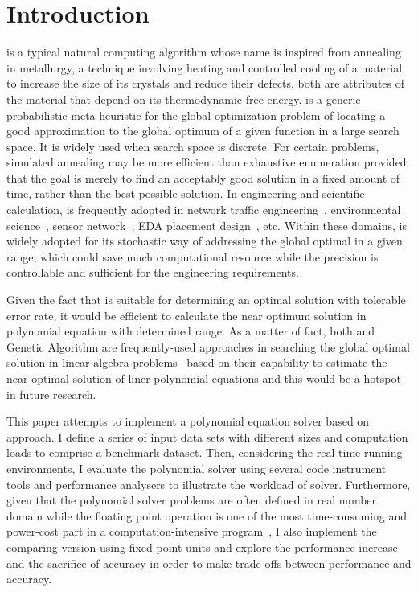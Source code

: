 \section{Introduction}
\label{sec:intro}
\SA is a typical natural computing algorithm whose name is inspired from  annealing in metallurgy, a technique involving heating and controlled cooling of a material to increase the size of its crystals and reduce their defects, both are attributes of the material that depend on its thermodynamic free energy. \SA is a generic probabilistic meta-heuristic for the global optimization problem of locating a good approximation to the global optimum of a given function in a large search space. It is widely used when search space is discrete. For certain problems, simulated annealing may be more efficient than exhaustive enumeration provided that the goal is merely to find an acceptably good solution in a fixed amount of time, rather than the best possible solution. In engineering and scientific calculation, \SA is frequently adopted in network traffic engineering~\cite{Pasias:2004}, environmental science~\cite{Jingwen:2009}, sensor network~\cite{Zimmerman:2007}, EDA placement design~\cite{Naifeng:2011}, etc. Within these domains, \SA is widely adopted for its stochastic way of addressing the global optimal in a given range, which could save much computational resource while the precision is controllable and sufficient for the engineering requirements.

Given the fact that \SA is suitable for determining an optimal solution with tolerable error rate, it would be efficient to calculate the near optimum solution in polynomial equation with determined range. As a matter of fact, both \SA and Genetic Algorithm are frequently-used approaches in searching the global optimal solution in linear algebra problems~\cite{Chen:1998} based on their capability to estimate the near optimal solution of liner polynomial equations and this would be a hotspot in future research.

This paper attempts to implement a polynomial equation solver based on \SA approach. I define a series of input data sets with different sizes and computation loads to comprise a benchmark dataset. Then, considering the real-time running environments, I evaluate the \SA polynomial solver using several code instrument tools and performance analysers to illustrate the workload of \SA solver. Furthermore, given that the polynomial solver problems are often defined in real number domain while the floating point operation is one of the most time-consuming and power-cost part in a computation-intensive program~\cite{DaiChen:2013}, I also implement the comparing version using fixed point units and explore the performance increase and the sacrifice of accuracy in order to make trade-offs between performance and accuracy.


